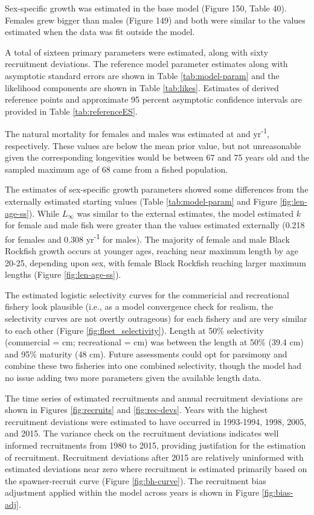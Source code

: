 \documentclass[11pt,
  english,
  letterpaper,
]{article}
\begin{document}
Sex-specific growth was estimated in the base model (Figure 150, Table 40). Females grew bigger than males (Figure 149) and both were similar to the values estimated when the data was fit outside the model.

A total of sixteen primary parameters were estimated, along with sixty recruitment deviations. The reference model parameter estimates along with asymptotic standard errors are shown in Table \ref{tab:model-param} and the likelihood components are shown in Table \ref{tab:likes}. Estimates of derived reference points and approximate 95 percent asymptotic confidence intervals are provided in Table \ref{tab:referenceES}.

The natural mortality for females and males was estimated at and yr\textsuperscript{-1}, respectively. These values are below the mean prior value, but not unreasonable given the corresponding longevities would be between 67 and 75 years old and the sampled maximum age of 68 came from a fished population.

The estimates of sex-specific growth parameters showed some differences from the externally estimated starting values (Table \ref{tab:model-param} and Figure \ref{fig:len-age-ss}). While \(L_{\infty}\) was similar to the external estimates, the model estimated \(k\) for female and male fish were greater than the values estimated externally (0.218 for females and 0.308 yr\textsuperscript{-1} for males). The majority of female and male Black Rockfish growth occurs at younger ages, reaching near maximum length by age 20-25, depending upon sex, with female Black Rockfish reaching larger maximum lengths (Figure \ref{fig:len-age-ss}).

The estimated logistic selectivity curves for the commericial and recreational fishery look plausible (i.e., as a model convergence check for realism, the selectivity curves are not overtly outrageous) for each fishery and are very similar to each other (Figure \ref{fig:fleet_selectivity}). Length at 50\% selectivity (commercial = cm; recreational = cm) was between the length at 50\% (39.4 cm) and 95\% maturity (48 cm). Future assessments could opt for parsimony and combine these two fisheries into one combined selectivity, though the model had no issue adding two more parameters given the available length data.

The time series of estimated recruitments and annual recruitment deviations are shown in Figures \ref{fig:recruits} and \ref{fig:rec-devs}. Years with the highest recruitment deviations were estimated to have occurred in 1993-1994, 1998, 2005, and 2015. The variance check on the recruitment deviations indicates well informed recruitments from 1980 to 2015, providing justifation for the estimation of recruitment. Recruitment deviations after 2015 are relatively uninformed with estimated deviations near zero where recruitment is estimated primarily based on the spawner-recruit curve (Figure \ref{fig:bh-curve}). The recruitment bias adjustment applied within the model across years is shown in Figure \ref{fig:bias-adj}.
\end{document}

